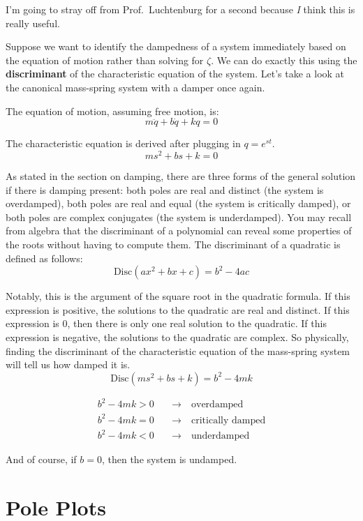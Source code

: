 \documentclass[
  letterpaper,
  DIV=11,
  numbers=noendperiod]{scrreprt}
\begin{document}
I'm going to stray off from Prof.~Luchtenburg for a second because
\emph{I} think this is really useful.

Suppose we want to identify the dampedness of a system immediately based
on the equation of motion rather than solving for \(\zeta\). We can do
exactly this using the \textbf{discriminant} of the characteristic
equation of the system. Let's take a look at the canonical mass-spring
system with a damper once again.

The equation of motion, assuming free motion, is:
\[m\ddot{q} + b \dot{q} + k q = 0\]

The characteristic equation is derived after plugging in \(q = e^{st}\).
\[ms^2 + bs + k = 0\]

As stated in the section on damping, there are three forms of the
general solution if there is damping present: both poles are real and
distinct (the system is overdamped), both poles are real and equal (the
system is critically damped), or both poles are complex conjugates (the
system is underdamped). You may recall from algebra that the
discriminant of a polynomial can reveal some properties of the roots
without having to compute them. The discriminant of a quadratic is
defined as follows: \[\text{Disc}(ax^2 + bx + c) = b^2-4ac\]

Notably, this is the argument of the square root in the quadratic
formula. If this expression is positive, the solutions to the quadratic
are real and distinct. If this expression is 0, then there is only one
real solution to the quadratic. If this expression is negative, the
solutions to the quadratic are complex. So physically, finding the
discriminant of the characteristic equation of the mass-spring system
will tell us how damped it is. \[\text{Disc}(ms^2 + bs + k) = b^2-4mk\]

\begin{align*}
    b^2 - 4mk > 0 \quad &\to \quad \text{overdamped} \\
    b^2 - 4mk = 0 \quad &\to \quad \text{critically damped} \\
    b^2 - 4mk < 0 \quad &\to \quad \text{underdamped}
\end{align*}

And of course, if \(b=0\), then the system is undamped.

\hypertarget{pole-plots}{%
\section{Pole Plots}\label{pole-plots}}
\end{document}
